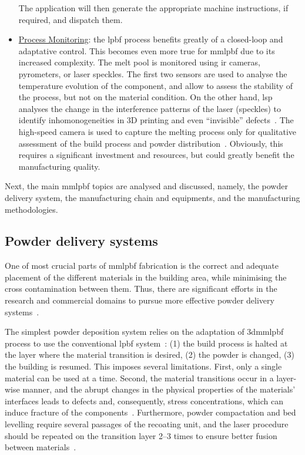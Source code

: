 \begin{itemize}
    The application will then generate the appropriate machine
    instructions, if required, and dispatch them. 
  \item \underline{Process Monitoring}: the \gls{lpbf} process benefits greatly
    of a closed-loop and adaptative control. This becomes even more true for
    \gls{mmlpbf} due to its increased complexity.
    The melt pool is monitored
    using \gls{ir} cameras, pyrometers, or laser speckles. The first two
    sensors are used to analyse the temperature evolution of the component, and
    allow to assess the stability of the process, but not on the material
    condition. On the other hand, \gls{lsp} analyses the change in the interference
patterns of the laser (speckles) to identify inhomonogeneities in 3D printing
and even ``invisible'' defects~\cite{chen2019laser}. The high-speed camera is
used to capture the melting process only for qualitative assessment of the build
process and powder distribution~\cite{obeidi2022LPBFGuidelines}.
Obviously, this requires a significant investment and resources, but could
greatly benefit the manufacturing quality.
  \end{itemize}

Next, the main \gls{mmlpbf} topics are analysed and discussed, namely, the
powder delivery system, the manufacturing chain and equipments, and the
manufacturing methodologies.

\subsection{Powder delivery systems}%
\label{sec:powd-deliv-syst}
One of most crucial parts of \gls{mmlpbf} fabrication is the correct and
adequate placement of the different materials in the building area, while
minimising the cross contamination between them. Thus, there are significant
efforts in the research and commercial domains to pursue more effective powder
delivery systems~\cite{mussatto2022research, aerosintPatternDrum2019}.

The simplest powder deposition system relies on the adaptation of \gls{3dmmlpbf}
process to use the conventional \gls{lpbf} system~\cite{bai2020dual, koopmann2019additive}: (1) the build process is halted
at the layer where the material transition is desired, (2) the powder is
changed, (3) the building is resumed. This imposes several limitations. First,
only a single material can be used at a time. Second, the material transitions
occur in a layer-wise manner\cite{mussatto2022research}, and the abrupt changes in the physical properties of the materials'
interfaces leads to defects and, consequently, stress concentrations, which can
induce fracture of the components~\cite{mahamood2015laser}.
Furthermore, powder
compactation and bed levelling require several passages of the recoating unit,
and the laser procedure should be repeated on the transition layer 2--3 times to
ensure better fusion between materials~\cite{bai2020dual}.

